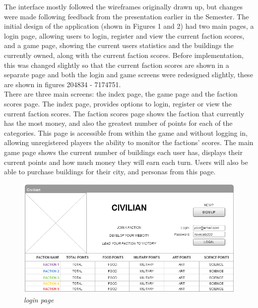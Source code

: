 \documentclass{sig-alt-release2}
\begin{document}
The interface mostly followed the wireframes originally drawn up, but changes were made following feedback from the presentation earlier in the Semester. The initial design of the application (shown in Figures 1 and 2) had two main pages, a login page, allowing users to login, register and view the current faction scores, and a game page, showing the current users statistics and the buildings the currently owned, along with the current faction scores. Before implementation, this was changed slightly so that the current faction scores are shown in a separate page and both the login and game screens were redesigned slightly, these are shown in figures 204834 - 7174751.\\

There are three main screens: the index page, the game page and the faction scores page. The index  page, provides options to login, register or view the current faction scores. The faction scores page shows the faction that currently has the most money, and also the greatest number of points for each of the categories. This page is accessible from within the game and without logging in, allowing unregistered players the ability to monitor the factions' scores. The main game page shows the current number of buildings each user has, displays their current points and how much money they will earn each turn. Users will also be able to purchase buildings for their city, and personas from this page. 

\begin{figure}[!htbp]
  \caption{\textit{login page}}
  \begin{center}
		\includegraphics[scale=0.25]{img/w3.png}
  \end{center}
\end{figure}
\end{document}
